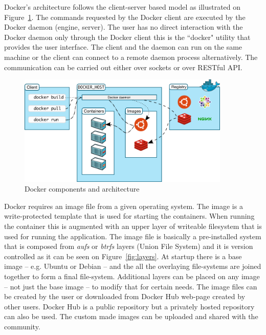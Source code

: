 \documentclass[a4paper]{article}
\begin{document}
Docker's architecture follows the client-server based model as illustrated on Figure~\ref{fig:arch}. The commands
requested by the Docker client are executed by the Docker daemon (engine, server).
The user has no direct interaction with the Docker daemon only through the Docker client this is the ``docker" utility
that provides the
user interface. The client and the daemon can run on the same machine or the client can connect to a remote daemon
process alternatively. The communication can be carried out either over sockets or over RESTful API.

\begin{figure}[H]
    \centering
    \includegraphics[width=0.9\textwidth]{figures/docker_arch.png}
    \caption{Docker components and architecture}
    \label{fig:arch}
\end{figure}

Docker requires an image file from a given operating system. The image is a write-protected template that is used for
starting the containers.
When running the container this is augmented with an upper layer of writeable filesystem that is used for running the
application. The image file
is basically a pre-installed system that is composed from \emph{aufs} or \emph{btrfs} layers (Union File System) and it
is version controlled as it can be seen on Figure~\ref{fig:layers}.
At startup there is a base image -- e.g. Ubuntu or Debian -- and the all the overlaying file-systems are joined
together to form a final file-system. Additional layers can be placed on any image -- not just the base image -- to
modify that for certain needs. The image files can be created by the user or downloaded from Docker Hub web-page
created by other users. Docker Hub is a public repository but a privately hosted repository can also be used. The
custom made images can be uploaded and shared with the community.
\end{document}
